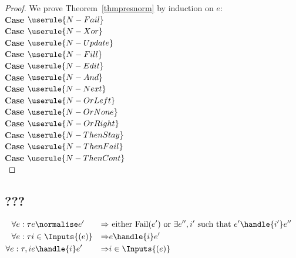 \begin{proof}
  We prove Theorem~\ref{thmpresnorm} by induction on $e$:\\

  \noindent\textbf{Case} $\userule{N-Fail}$\\

  \noindent\textbf{Case} $\userule{N-Xor}$\\

  \noindent\textbf{Case} $\userule{N-Update}$\\

  \noindent\textbf{Case} $\userule{N-Fill}$\\

  \noindent\textbf{Case} $\userule{N-Edit}$\\

  \noindent\textbf{Case} $\userule{N-And}$\\

  \noindent\textbf{Case} $\userule{N-Next}$\\

  \noindent\textbf{Case} $\userule{N-OrLeft}$\\

  \noindent\textbf{Case} $\userule{N-OrNone}$\\

  \noindent\textbf{Case} $\userule{N-OrRight}$\\

  \noindent\textbf{Case} $\userule{N-ThenStay}$\\

  \noindent\textbf{Case} $\userule{N-ThenFail}$\\

  \noindent\textbf{Case} $\userule{N-ThenCont}$\\

\end{proof}
\subsection{???}

\begin{align*}
  \forall e:\tau & e \normalise e' &\implies& \text{ either Fail}(e') \text{ or } \exists e'',i' \text{ such that } e'\handle{i'}e''&\\
  \forall e:\tau & i\in\Inputs{(e)} &\implies& e\handle{i}e'\\
  \forall e:\tau, i & e\handle{i}e' &\implies& i\in\Inputs{(e)}
\end{align*}
